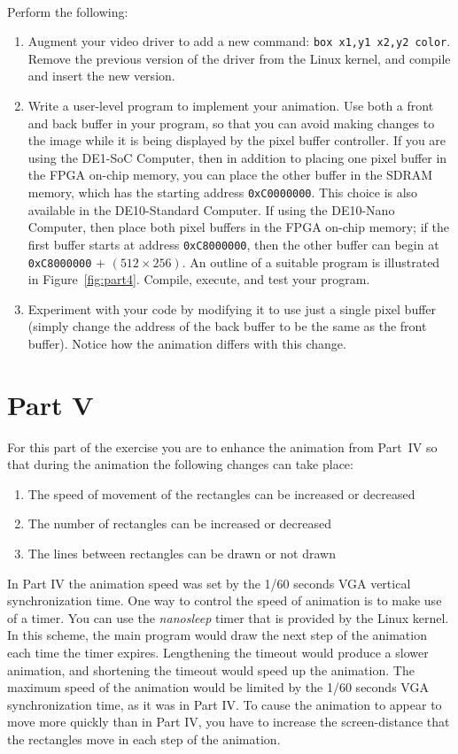\documentclass[epsfig,10pt,fullpage]{article}
\begin{document}
~\\
\noindent
Perform the following:

\begin{enumerate}
\item Augment your video driver to add a new command: \texttt{box x1,y1 x2,y2 color}. Remove
the previous version of the driver from the Linux kernel, and compile and insert the new version.
\item Write a user-level program to implement your animation. Use both a front and back buffer 
in your program, so that you can avoid making changes to the image while it is being displayed 
by the pixel buffer controller. If you are using the DE1-SoC Computer, then in addition to 
placing one pixel buffer in the FPGA on-chip memory, you can place the other buffer in 
the SDRAM memory, which has the starting address \texttt{0xC0000000}. This choice is also
available in the DE10-Standard Computer. If using the DE10-Nano Computer, then place both pixel
buffers in the FPGA on-chip memory; if the first buffer starts at address \texttt{0xC8000000}, 
then the other buffer can begin at \texttt{0xC8000000} $+$ $(512 \times 256)$.
An outline of a suitable program is illustrated in 
Figure~\ref{fig:part4}. Compile, execute, and test your program.

\item Experiment with your code by modifying it to use just a single pixel buffer (simply
change the address of the back buffer to be the same as the front buffer). Notice how the
animation differs with this change.
\end{enumerate}

\section*{Part V}

\noindent
For this part of the exercise you are to enhance the animation from Part~IV so that during the
animation the following changes can take place:

\begin{enumerate}
\item
The speed of movement of the rectangles can be increased or decreased
\item
The number of rectangles can be increased or decreased
\item
The lines between rectangles can be drawn or not drawn
\end{enumerate}
\noindent
In Part IV the animation speed was set by the 1/60 seconds VGA vertical synchronization time.
One way to control the speed of animation is to make use of a timer. You can use the
{\it nanosleep} timer that is provided by the Linux kernel. In this scheme, the main 
program would draw the next step of the animation each time the timer expires.  Lengthening 
the timeout would produce a slower animation, and shortening the timeout would speed up the 
animation. The maximum speed of the animation would be limited by the 1/60 seconds VGA
synchronization time, as it was in Part IV. To cause the animation to appear to move more 
quickly than in Part IV, you have to increase the screen-distance that the rectangles move
in each step of the animation.
\end{document}
